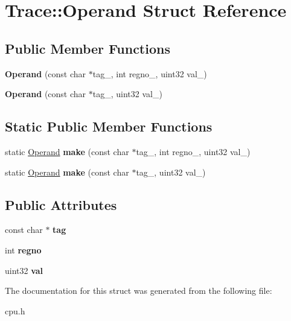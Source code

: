 \hypertarget{structTrace_1_1Operand}{
\section{Trace::Operand Struct Reference}
\label{structTrace_1_1Operand}
}
\subsection*{Public Member Functions}
\begin{DoxyCompactItemize}
\item 
\hypertarget{structTrace_1_1Operand_a4d3d267d61dbcd7b7908c422b4172638}{
{\bfseries Operand} (const char $\ast$tag\_\-, int regno\_\-, uint32 val\_\-)}
\label{structTrace_1_1Operand_a4d3d267d61dbcd7b7908c422b4172638}

\item 
\hypertarget{structTrace_1_1Operand_ad0114607af6885d946620aef2490febf}{
{\bfseries Operand} (const char $\ast$tag\_\-, uint32 val\_\-)}
\label{structTrace_1_1Operand_ad0114607af6885d946620aef2490febf}

\end{DoxyCompactItemize}
\subsection*{Static Public Member Functions}
\begin{DoxyCompactItemize}
\item 
\hypertarget{structTrace_1_1Operand_a447d15d9296741d1932284be020a7e72}{
static \hyperlink{structTrace_1_1Operand}{Operand} {\bfseries make} (const char $\ast$tag\_\-, int regno\_\-, uint32 val\_\-)}
\label{structTrace_1_1Operand_a447d15d9296741d1932284be020a7e72}

\item 
\hypertarget{structTrace_1_1Operand_a8907c7fe05eb0bd1e770ea3a246b59e1}{
static \hyperlink{structTrace_1_1Operand}{Operand} {\bfseries make} (const char $\ast$tag\_\-, uint32 val\_\-)}
\label{structTrace_1_1Operand_a8907c7fe05eb0bd1e770ea3a246b59e1}

\end{DoxyCompactItemize}
\subsection*{Public Attributes}
\begin{DoxyCompactItemize}
\item 
\hypertarget{structTrace_1_1Operand_a9b796de2fc78d642b7330745c2d8a520}{
const char $\ast$ {\bfseries tag}}
\label{structTrace_1_1Operand_a9b796de2fc78d642b7330745c2d8a520}

\item 
\hypertarget{structTrace_1_1Operand_a6c025207b70e102cb5338258d709136e}{
int {\bfseries regno}}
\label{structTrace_1_1Operand_a6c025207b70e102cb5338258d709136e}

\item 
\hypertarget{structTrace_1_1Operand_a551b2f8b156c890c2399f04d8d9dfefb}{
uint32 {\bfseries val}}
\label{structTrace_1_1Operand_a551b2f8b156c890c2399f04d8d9dfefb}

\end{DoxyCompactItemize}


The documentation for this struct was generated from the following file:\begin{DoxyCompactItemize}
\item 
cpu.h\end{DoxyCompactItemize}
